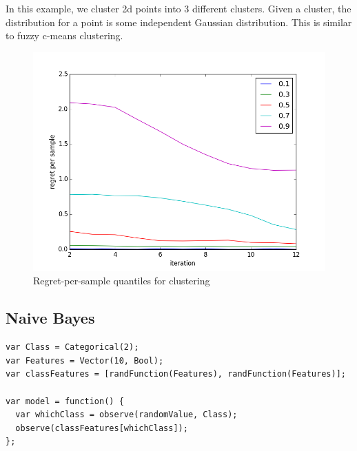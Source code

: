 \documentclass{article}
\begin{document}
In this example, we cluster 2d points into 3 different clusters.  Given a cluster, the distribution for a point is some independent Gaussian distribution.  This is similar to fuzzy c-means clustering.

  \begin{figure}[h]
\begin{center}
  \includegraphics[scale=0.5]{../plots/accuracy_nd_clustering.png}
\end{center}
\caption{Regret-per-sample quantiles for clustering}
\end{figure}

% 

\subsection{Naive Bayes}

{\small
\begin{lstlisting}
var Class = Categorical(2);
var Features = Vector(10, Bool);
var classFeatures = [randFunction(Features), randFunction(Features)];

var model = function() {
  var whichClass = observe(randomValue, Class);
  observe(classFeatures[whichClass]);
};
\end{lstlisting}
}
\end{document}
